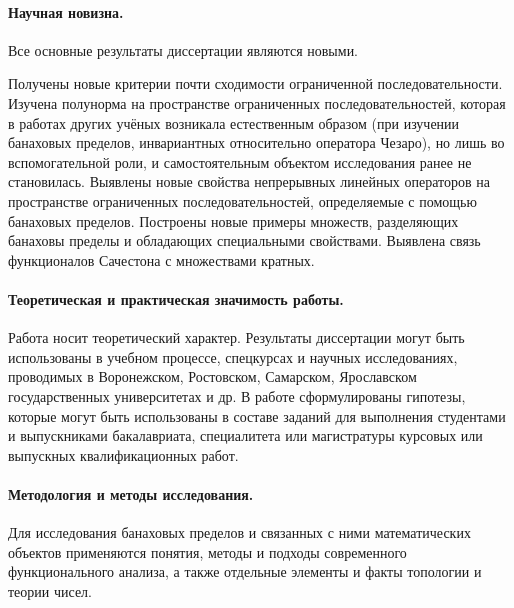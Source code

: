 \paragraph{Научная новизна.}
Все основные результаты диссертации являются новыми.

Получены новые критерии почти сходимости ограниченной последовательности.
Изучена полунорма на пространстве ограниченных последовательностей,
которая в работах других учёных возникала естественным образом
(при изучении банаховых пределов, инвариантных относительно оператора Чезаро),
но лишь во вспомогательной роли,
и самостоятельным объектом исследования ранее не становилась.
Выявлены новые свойства непрерывных линейных операторов на пространстве ограниченных последовательностей,
определяемые с помощью банаховых пределов.
Построены новые примеры множеств, разделяющих банаховы пределы и обладающих специальными свойствами.
Выявлена связь функционалов Сачестона с множествами кратных.


\paragraph{Теоретическая и практическая значимость работы.}
Работа носит теоретический характер.
Результаты диссертации могут быть использованы в учебном процессе, спецкурсах и научных исследованиях,
проводимых в Воронежском, Ростовском, Самарском, Ярославском государственных университетах и др.
В работе сформулированы гипотезы,
которые могут быть использованы в составе заданий для выполнения
студентами и выпускниками бакалавриата, специалитета или магистратуры
курсовых или выпускных квалификационных работ.





\paragraph{Методология и методы исследования.}
Для исследования банаховых пределов и связанных с ними математических объектов применяются
понятия, методы и подходы современного функционального анализа,
а также отдельные элементы и факты топологии и теории чисел.

